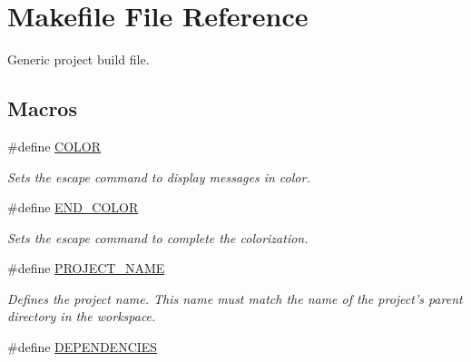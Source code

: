 \hypertarget{_makefile}{\section{Makefile File Reference}
\label{_makefile}
}


Generic project build file.  


\subsection*{Macros}
\begin{DoxyCompactItemize}
\item 
\hypertarget{_makefile_a4b5014034c9aac136ab8c82c2d16dc82}{\#define \hyperlink{_makefile_a4b5014034c9aac136ab8c82c2d16dc82}{C\+O\+L\+O\+R}}\label{_makefile_a4b5014034c9aac136ab8c82c2d16dc82}

\begin{DoxyCompactList}\small\item\em Sets the escape command to display messages in color. \end{DoxyCompactList}\item 
\hypertarget{_makefile_a475df0d9bbf72a496b3b362ef75a2a0f}{\#define \hyperlink{_makefile_a475df0d9bbf72a496b3b362ef75a2a0f}{E\+N\+D\+\_\+\+C\+O\+L\+O\+R}}\label{_makefile_a475df0d9bbf72a496b3b362ef75a2a0f}

\begin{DoxyCompactList}\small\item\em Sets the escape command to complete the colorization. \end{DoxyCompactList}\item 
\hypertarget{group___project___variables_gae73053051efbb45c3a39751f5ce9fb36}{\#define \hyperlink{group___project___variables_gae73053051efbb45c3a39751f5ce9fb36}{P\+R\+O\+J\+E\+C\+T\+\_\+\+N\+A\+M\+E}}\label{group___project___variables_gae73053051efbb45c3a39751f5ce9fb36}

\begin{DoxyCompactList}\small\item\em Defines the project name. This name must match the name of the project's parent directory in the workspace. \end{DoxyCompactList}\item 
\hypertarget{group___project___variables_gad661cebbb68b497f00fba5676c36eaea}{\#define \hyperlink{group___project___variables_gad661cebbb68b497f00fba5676c36eaea}{D\+E\+P\+E\+N\+D\+E\+N\+C\+I\+E\+S}}\label{group___project___variables_gad661cebbb68b497f00fba5676c36eaea}


\end{DoxyCompactItemize}
